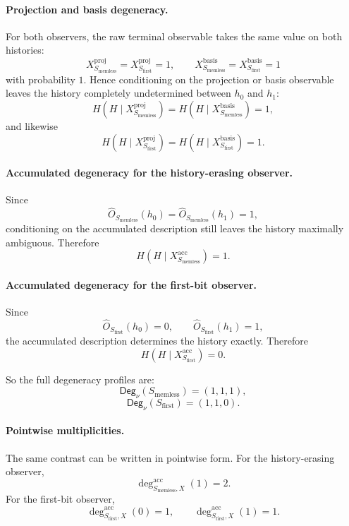 \documentclass[11pt,twoside]{article}
\theoremstyle{definition}
\newcommand{\proj}{\mathrm{proj}}
\newcommand{\basis}{\mathrm{basis}}
\newcommand{\acc}{\mathrm{acc}}
\begin{document}
\paragraph{Projection and basis degeneracy.}
For both observers, the raw terminal observable takes the same value on both histories:
\[
  X_{S_{\mathrm{memless}}}^{\proj}
  =
  X_{S_{\mathrm{first}}}^{\proj}
  =
  1,
  \qquad
  X_{S_{\mathrm{memless}}}^{\basis}
  =
  X_{S_{\mathrm{first}}}^{\basis}
  =
  1
\]
with probability \(1\). Hence conditioning on the projection or basis observable leaves the history completely undetermined between \(h_0\) and \(h_1\):
\[
  H(H\mid X_{S_{\mathrm{memless}}}^{\proj})
  =
  H(H\mid X_{S_{\mathrm{memless}}}^{\basis})
  =
  1,
\]
and likewise
\[
  H(H\mid X_{S_{\mathrm{first}}}^{\proj})
  =
  H(H\mid X_{S_{\mathrm{first}}}^{\basis})
  =
  1.
\]

\paragraph{Accumulated degeneracy for the history-erasing observer.}
Since
\[
  \widehat{O}_{S_{\mathrm{memless}}}(h_0)
  =
  \widehat{O}_{S_{\mathrm{memless}}}(h_1)=1,
\]
conditioning on the accumulated description still leaves the history maximally ambiguous. Therefore
\[
  H(H\mid X_{S_{\mathrm{memless}}}^{\acc})=1.
\]

\paragraph{Accumulated degeneracy for the first-bit observer.}
Since
\[
  \widehat{O}_{S_{\mathrm{first}}}(h_0)=0,
  \qquad
  \widehat{O}_{S_{\mathrm{first}}}(h_1)=1,
\]
the accumulated description determines the history exactly. Therefore
\[
  H(H\mid X_{S_{\mathrm{first}}}^{\acc})=0.
\]

So the full degeneracy profiles are:
\[
  \mathsf{Deg}_\nu(S_{\mathrm{memless}})
  =
  (1,1,1),
\]
\[
  \mathsf{Deg}_\nu(S_{\mathrm{first}})
  =
  (1,1,0).
\]

\paragraph{Pointwise multiplicities.}
The same contrast can be written in pointwise form. For the history-erasing observer,
\[
  \deg^{\acc}_{S_{\mathrm{memless}},X}(1)=2.
\]
For the first-bit observer,
\[
  \deg^{\acc}_{S_{\mathrm{first}},X}(0)=1,
  \qquad
  \deg^{\acc}_{S_{\mathrm{first}},X}(1)=1.
\]
\end{document}
